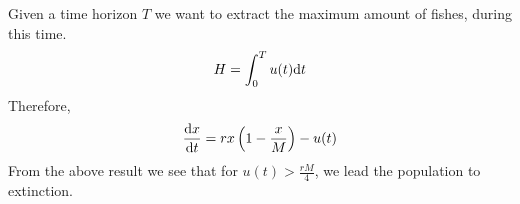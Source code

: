 Given a time horizon $T$ we want to extract the maximum amount of fishes, during this time.
\begin{equation}
H=\int_{0}^{T} u(t)\mathrm{d} t
\end{equation}
Therefore,
\begin{equation}
	\frac{\mathrm{d} x}{{\mathrm{d} t}}=rx\left(1-\frac{x}{M}\right)-u(t)
\end{equation}
From the above result we see that for $u(t)>\frac{rM}{4}$, we lead the population to extinction.